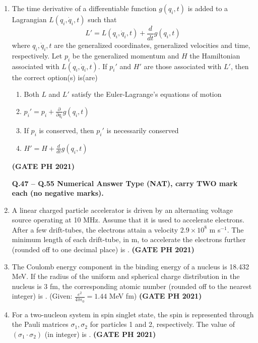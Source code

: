 \documentclass[14pt, a4paper]{extarticle}
\begin{document}
\begin{enumerate}[label=\textbf{Q.\arabic*}]
\begin{enumerate}[label=\textbf{Q.\arabic*}]
\item The time derivative of a differentiable function $g(q_i, t)$ is added to a Lagrangian $L(q_i, \dot{q}_i, t)$ such that
$$ L' = L(q_i, \dot{q}_i, t) + \frac{d}{dt}g(q_i, t) $$
where $q_i, \dot{q}_i, t$ are the generalized coordinates, generalized velocities and time, respectively. Let $p_i$ be the generalized momentum and $H$ the Hamiltonian associated with $L(q_i, \dot{q}_i, t)$. If $p_i'$ and $H'$ are those associated with $L'$, then the correct option(s) is(are)
\begin{enumerate}
\item Both $L$ and $L'$ satisfy the Euler-Lagrange's equations of motion
\item $p_i' = p_i + \frac{\partial}{\partial q_i} g(q_i, t)$
\item If $p_i$ is conserved, then $p_i'$ is necessarily conserved
\item $H' = H + \frac{d}{dt}g(q_i, t)$
\end{enumerate}
\hfill \textbf{(GATE PH 2021)}

\textbf{Q.47 – Q.55 Numerical Answer Type (NAT), carry TWO mark each (no negative marks).}

\item A linear charged particle accelerator is driven by an alternating voltage source operating at 10 MHz. Assume that it is used to accelerate electrons. After a few drift-tubes, the electrons attain a velocity $2.9 \times 10^8$ m s$^{-1}$. The minimum length of each drift-tube, in m, to accelerate the electrons further (rounded off to one decimal place) is \underline{\hspace{3cm}}.
\hfill \textbf{(GATE PH 2021)}

\item The Coulomb energy component in the binding energy of a nucleus is 18.432 MeV. If the radius of the uniform and spherical charge distribution in the nucleus is 3 fm, the corresponding atomic number (rounded off to the nearest integer) is \underline{\hspace{3cm}}.
(Given: $\frac{e^2}{4\pi\epsilon_0} = 1.44$ MeV fm)
\hfill \textbf{(GATE PH 2021)}

\item For a two-nucleon system in spin singlet state, the spin is represented through the Pauli matrices $\sigma_1, \sigma_2$ for particles 1 and 2, respectively. The value of $(\sigma_1 \cdot \sigma_2)$ (in integer) is \underline{\hspace{3cm}}.
\hfill \textbf{(GATE PH 2021)}


\end{enumerate}
\end{enumerate}
\end{document}
